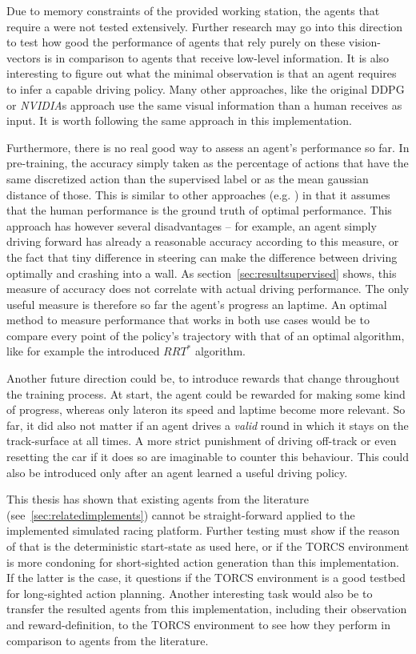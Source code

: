 Due to memory constraints of the provided working station, the agents that require a  were not tested extensively. Further research may go into this direction to test how good the performance of agents that rely purely on these vision-vectors is in comparison to agents that receive low-level information. It is also interesting to figure out what the minimal observation is that an agent requires to infer a capable driving policy. Many other approaches, like the original DDPG \cite{lillicrap_continuous_2015} or \textit{NVIDIA}s approach \cite{bojarski_end_2016} use the same visual information than a human receives as input. It is worth following the same approach in this implementation.

Furthermore, there is no real good way to assess an agent's performance so far. In pre-training, the accuracy simply taken as the percentage of actions that have the same discretized action than the supervised label or as the mean gaussian distance of those. This is similar to other approaches (e.g. \cite{bojarski_end_2016}) in that it assumes that the human performance is the ground truth of optimal performance. This approach has however several disadvantages -- for example, an agent simply driving forward has already a reasonable accuracy according to this measure, or the fact that tiny difference in steering can make the difference between driving optimally and crashing into a wall. As section~\ref{sec:resultsupervised} shows, this measure of accuracy does not correlate with actual driving performance. The only useful measure is therefore so far the agent's progress an laptime. An optimal method to measure performance that works in both use cases would be to compare every point of the policy's trajectory with that of an optimal algorithm, like for example the introduced $RRT^*$ algorithm.

Another future direction could be, to introduce rewards that change throughout the training process. At start, the agent could be rewarded for making some kind of progress, whereas only lateron its speed and laptime become more relevant. So far, it did also not matter if an agent drives a \textit{valid} round in which it stays on the track-surface at all times. A more strict punishment of driving off-track or even resetting the car if it does so are imaginable to counter this behaviour. This could also be introduced only after an agent learned a useful driving policy.

This thesis has shown that existing agents from the literature (see~\ref{sec:relatedimplements}) cannot be straight-forward applied to the implemented simulated racing platform. Further testing must show if the reason of that is the deterministic start-state as used here, or if the TORCS environment is more condoning for short-sighted action generation than this implementation. If the latter is the case, it questions if the TORCS environment is a good testbed for long-sighted action planning. Another interesting task would also be to transfer the resulted agents from this implementation, including their observation and reward-definition, to the TORCS environment to see how they perform in comparison to agents from the literature. 

